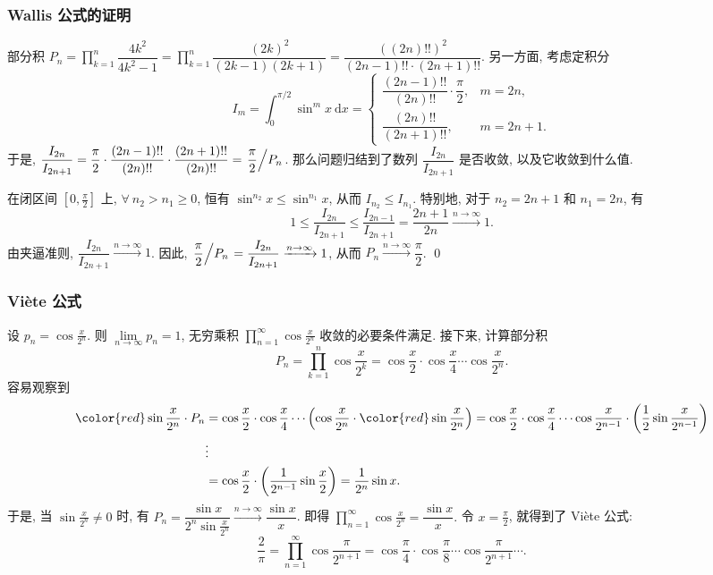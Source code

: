 \begin{frame}
\frametitle{Wallis 公式的证明}

\startproof[bg=yellow, fg=red]
部分积 $P_n = \prod_{k=1}^n \dfrac{4k^2}{4k^2 - 1} = \prod_{k=1}^n \dfrac{(2k)^2}{(2k-1)(2k+1)} = \dfrac{((2n)!!)^2}{(2n-1)!! \cdot (2n+1)!!}$.
另一方面, 考虑定积分
\[
I_m = \int_0^{\pi/2} \sin^m x ~ \mathrm{d}x = \begin{cases}
\dfrac{(2n-1)!!}{(2n)!!} \cdot \dfrac{\pi}{2}, & m = 2n, \\
\dfrac{(2n)!!}{(2n+1)!!}, & m = 2n+1.
\end{cases}
\]
于是, $\dfrac{I_{2n}}{I_{2n+1}} = \dfrac{\pi}{2} \cdot \dfrac{(2n-1)!!}{(2n)!!} \cdot \dfrac{(2n+1)!!}{(2n)!!} = \left.\dfrac{\pi}{2} \middle/ P_n\right.$. 那么问题归结到了数列 $\dfrac{I_{2n}}{I_{2n+1}}$ 是否收敛, 以及它收敛到什么值.

\pause
\vspace{0.5em}

在闭区间 $\left[0, \frac{\pi}{2}\right]$ 上, $\forall ~ n_2 > n_1 \geq 0$, 恒有 $\sin^{n_2} x \leqslant \sin^{n_1} x$, 从而 $I_{n_2} \leqslant I_{n_1}$. 特别地, 对于 $n_2 = 2n+1$ 和 $n_1 = 2n$, 有
\[
1 \leqslant \dfrac{I_{2n}}{I_{2n+1}} \leqslant \dfrac{I_{2n-1}}{I_{2n+1}} = \dfrac{2n+1}{2n} \xrightarrow[]{n \to \infty} 1.
\]
由夹逼准则, $\dfrac{I_{2n}}{I_{2n+1}} \xrightarrow[]{n \to \infty} 1$. 因此, $\left.\dfrac{\pi}{2} \middle/ P_n\right. = \dfrac{I_{2n}}{I_{2n+1}} \xrightarrow[]{n \to \infty} 1$, 从而 $P_n \xrightarrow[]{n \to \infty} \dfrac{\pi}{2}$.
\qed

\end{frame}


\begin{frame}
\frametitle{Viète 公式}

设 $p_n = \cos \frac{x}{2^{n}}.$ 则 $\lim\limits_{n \to \infty} p_n = 1$, 无穷乘积 $\prod_{n=1}^\infty \cos \frac{x}{2^{n}}$ 收敛的必要条件满足. 接下来, 计算部分积
\[
P_n = \prod_{k=1}^n \cos \frac{x}{2^{k}} = \cos \frac{x}{2} \cdot \cos \frac{x}{4} \cdots \cos \frac{x}{2^n}.
\]
容易观察到
\begin{align*}
{\color{red}\sin \frac{x}{2^n}} \cdot P_n & = \cos \frac{x}{2} \cdot \cos \frac{x}{4} \cdots \left( \cos \frac{x}{2^n} \cdot {\color{red}\sin \frac{x}{2^n}} \right) = \cos \frac{x}{2} \cdot \cos \frac{x}{4} \cdots \cos \frac{x}{2^{n-1}} \cdot \left( \frac{1}{2}\sin \frac{x}{2^{n-1}} \right) \\
& \vdots \\
& = \cos \frac{x}{2} \cdot \left( \frac{1}{2^{n-1}}\sin \frac{x}{2} \right) = \frac{1}{2^n} \sin x.
\end{align*}
于是, 当 $\sin \frac{x}{2^n} \neq 0$ 时, 有 $P_n = \dfrac{\sin x}{2^n \sin \frac{x}{2^n}} \xrightarrow[]{n \to \infty} \dfrac{\sin x}{x}$. 即得 $\prod_{n=1}^\infty \cos \frac{x}{2^{n}} = \dfrac{\sin x}{x}.$ 令 $x = \frac{\pi}{2}$, 就得到了 Viète 公式:
\[
\frac{2}{\pi} = \prod_{n=1}^\infty \cos \frac{\pi}{2^{n+1}} = \cos \frac{\pi}{4} \cdot \cos \frac{\pi}{8} \cdots \cos \frac{\pi}{2^{n+1}} \cdots.
\]

\end{frame}


